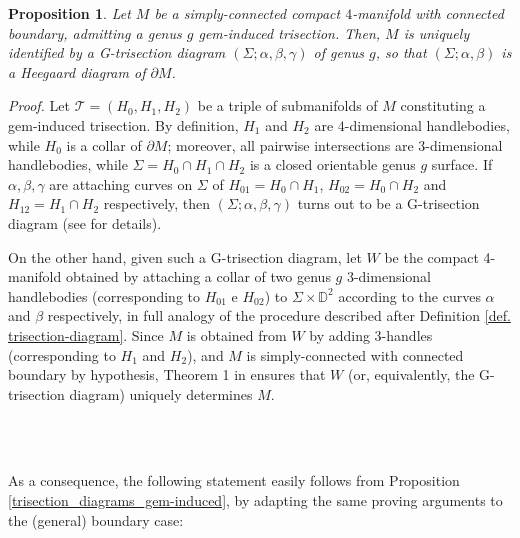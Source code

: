 \documentclass[12pt,a4paper]{article}
\newtheorem{proposition}[lemma]{Proposition}
\newcommand{\dimo}{\noindent \emph{Proof. }}
\newcommand{\qed}{\\ \rightline{$\Box$ \ \ \ \ \ \ \ \ \ \ \ \ \ \ \ }\\}
\begin{document}
\medskip

 \begin{proposition}   \label{trisection_diagrams_simply-connected_bounded}
     Let $M$ be a simply-connected compact $4$-manifold with connected boundary, admitting a genus $g$ gem-induced trisection. 
     Then, $M$ is uniquely identified by a G-trisection diagram $(\Sigma; \alpha, \beta, \gamma)$ of genus $g$, 
     so that $(\Sigma; \alpha, \beta)$ is a Heegaard diagram of $\partial M$.    
 \end{proposition} 

 \dimo
Let $\mathcal  T = (H_{0},H_{1},H_{2})$ be a triple of submanifolds of $M$ constituting a gem-induced trisection. By definition,  $H_{1}$ and $H_{2}$ are $4$-dimensional handlebodies, while $H_{0}$ is a collar of $\partial M$; moreover, all pairwise intersections are 3-dimensional handlebodies, while $\Sigma = H_{0} \cap H_{1} \cap H_{2}$ is a closed orientable genus $g$ surface. 
If $\alpha, \beta, \gamma$ are attaching curves on $\Sigma$ of $H_{01}=H_0 \cap H_1$, $H_{02} = H_0 \cap H_2$ and $H_{12}=H_1 \cap H_2$ respectively,  
then $(\Sigma; \alpha, \beta, \gamma)$ turns out to be a G-trisection diagram (see \cite[Remark 15]{Casali-Cristofori gem-induced} for details). 

On the other hand, given such a G-trisection diagram, let $W$ be the compact 4-manifold obtained by attaching a collar of two genus $g$ 3-dimensional handlebodies   
(corresponding to $H_{01}$ e $H_{02}$)  to $\Sigma \times \mathbb D^2$  according to the curves $\alpha$ and $\beta$ respectively, in full analogy of the procedure described after Definition \ref{def. trisection-diagram}.  Since $M$ is obtained from $W$ by adding %
3-handles (corresponding to $H_1$ and $H_2$), and $M$ is simply-connected with connected boundary by hypothesis, Theorem 1 in \cite{[Trace 1982]}  
ensures that $W$ (or, equivalently, the G-trisection diagram) uniquely determines $M$.

 \  \qed


\medskip

As a consequence, the following statement easily follows from Proposition \ref{trisection_diagrams_gem-induced}, by adapting the same proving arguments to the (general) boundary case: 
\end{document}
